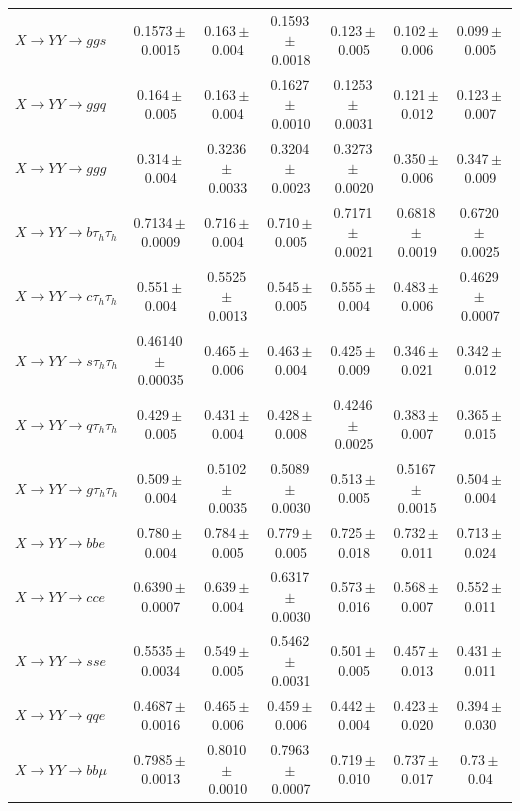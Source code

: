 \documentclass[12pt]{article}   %
\begin{document}
\begin{landscape}
{\begin{longtable}{@{\extracolsep{\fill}}lcccccc@{}}
$X\to YY\to ggs$ & 0.1573\,$\pm$\,0.0015 & 0.163\,$\pm$\,0.004 & 0.1593\,$\pm$\,0.0018 & 0.123\,$\pm$\,0.005 & 0.102\,$\pm$\,0.006 & 0.099\,$\pm$\,0.005 \\
$X\to YY\to ggq$ & 0.164\,$\pm$\,0.005 & 0.163\,$\pm$\,0.004 & 0.1627\,$\pm$\,0.0010 & 0.1253\,$\pm$\,0.0031 & 0.121\,$\pm$\,0.012 & 0.123\,$\pm$\,0.007 \\
$X\to YY\to ggg$ & 0.314\,$\pm$\,0.004 & 0.3236\,$\pm$\,0.0033 & 0.3204\,$\pm$\,0.0023 & 0.3273\,$\pm$\,0.0020 & 0.350\,$\pm$\,0.006 & 0.347\,$\pm$\,0.009 \\
\midrule
$X\to YY\to b\tau_h\tau_h$ & 0.7134\,$\pm$\,0.0009 & 0.716\,$\pm$\,0.004 & 0.710\,$\pm$\,0.005 & 0.7171\,$\pm$\,0.0021 & 0.6818\,$\pm$\,0.0019 & 0.6720\,$\pm$\,0.0025 \\
$X\to YY\to c\tau_h\tau_h$ & 0.551\,$\pm$\,0.004 & 0.5525\,$\pm$\,0.0013 & 0.545\,$\pm$\,0.005 & 0.555\,$\pm$\,0.004 & 0.483\,$\pm$\,0.006 & 0.4629\,$\pm$\,0.0007 \\
$X\to YY\to s\tau_h\tau_h$ & 0.46140\,$\pm$\,0.00035 & 0.465\,$\pm$\,0.006 & 0.463\,$\pm$\,0.004 & 0.425\,$\pm$\,0.009 & 0.346\,$\pm$\,0.021 & 0.342\,$\pm$\,0.012 \\
$X\to YY\to q\tau_h\tau_h$ & 0.429\,$\pm$\,0.005 & 0.431\,$\pm$\,0.004 & 0.428\,$\pm$\,0.008 & 0.4246\,$\pm$\,0.0025 & 0.383\,$\pm$\,0.007 & 0.365\,$\pm$\,0.015 \\
$X\to YY\to g\tau_h\tau_h$ & 0.509\,$\pm$\,0.004 & 0.5102\,$\pm$\,0.0035 & 0.5089\,$\pm$\,0.0030 & 0.513\,$\pm$\,0.005 & 0.5167\,$\pm$\,0.0015 & 0.504\,$\pm$\,0.004 \\
\midrule
$X\to YY\to bbe$ & 0.780\,$\pm$\,0.004 & 0.784\,$\pm$\,0.005 & 0.779\,$\pm$\,0.005 & 0.725\,$\pm$\,0.018 & 0.732\,$\pm$\,0.011 & 0.713\,$\pm$\,0.024 \\
$X\to YY\to cce$ & 0.6390\,$\pm$\,0.0007 & 0.639\,$\pm$\,0.004 & 0.6317\,$\pm$\,0.0030 & 0.573\,$\pm$\,0.016 & 0.568\,$\pm$\,0.007 & 0.552\,$\pm$\,0.011 \\
$X\to YY\to sse$ & 0.5535\,$\pm$\,0.0034 & 0.549\,$\pm$\,0.005 & 0.5462\,$\pm$\,0.0031 & 0.501\,$\pm$\,0.005 & 0.457\,$\pm$\,0.013 & 0.431\,$\pm$\,0.011 \\
$X\to YY\to qqe$ & 0.4687\,$\pm$\,0.0016 & 0.465\,$\pm$\,0.006 & 0.459\,$\pm$\,0.006 & 0.442\,$\pm$\,0.004 & 0.423\,$\pm$\,0.020 & 0.394\,$\pm$\,0.030 \\
$X\to YY\to bb\mu$ & 0.7985\,$\pm$\,0.0013 & 0.8010\,$\pm$\,0.0010 & 0.7963\,$\pm$\,0.0007 & 0.719\,$\pm$\,0.010 & 0.737\,$\pm$\,0.017 & 0.73\,$\pm$\,0.04 \\

\end{longtable}}
\end{landscape}
\end{document}
